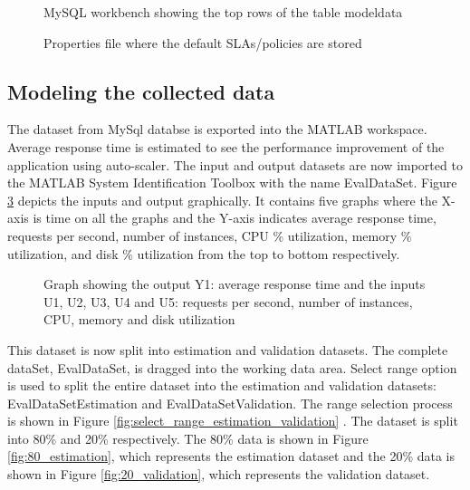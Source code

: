 \documentclass[article,type=msc,colorback,12pt,accentcolor=tud8b,table]{tudthesis}
\begin{document}
		  	  \begin{figure}[h]
		  	  	\begin{center}
		  	  		\makebox[\textwidth]{\texttt{[image: E6]}}
		  	  	\end{center}
		  	  	\caption{MySQL workbench showing the top rows of the table modeldata}
		  	  	\label{fig:db_rows}
		  	  \end{figure}
		  	  
 		  	  \begin{figure}[h]
  	  		  	  	\begin{center}
  	  		  	  	\end{center}
  	  		  	  	\caption{Properties file where the default SLAs/policies are stored}
  	  		  	  	\label{fig:autoscaler_sla_policies}
 		  	  \end{figure}
		  	  
		  	  
	
	\subsection{Modeling the collected data}
	
	The dataset from MySql databse is exported into the MATLAB workspace. Average response time is estimated to see the performance improvement of the application using auto-scaler. The input and output datasets are now imported to the MATLAB System Identification Toolbox with the name EvalDataSet. Figure \ref{fig:output_responsetime_input_5} depicts the inputs and output graphically. It contains five graphs where the X-axis is time on all the graphs and the Y-axis indicates average response time, requests per second, number of instances, CPU \% utilization, memory \% utilization, and disk \% utilization from the top to bottom respectively.
	
\begin{figure}
	\begin{center}
	\end{center}
	\caption{Graph showing the output Y1: average response time and the inputs U1, U2, U3, U4 and U5: requests per second, number of instances, CPU, memory and disk utilization }
	\label{fig:output_responsetime_input_5}
\end{figure}
This dataset is now split into estimation and validation datasets. The complete dataSet, EvalDataSet, is dragged into the working data area. Select range option is used to split the entire dataset into the estimation and validation datasets: EvalDataSetEstimation and EvalDataSetValidation. The range selection process is shown in Figure \ref{fig:select_range_estimation_validation} . The dataset is split into 80\% and 20\% respectively. The 80\% data is shown in Figure \ref{fig:80_estimation}, which represents the estimation dataset and the 20\% data is shown in Figure \ref{fig:20_validation}, which represents the validation dataset. 
\end{document}
